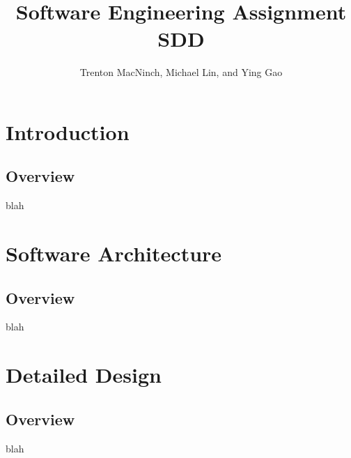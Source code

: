 \documentclass{article}
\title{\textbf{Software Engineering Assignment SDD}}
\author{Trenton MacNinch, Michael Lin, and Ying Gao}
\begin{document}
\maketitle
\newpage

\tableofcontents
\newpage

\section{Introduction}
\subsection{Overview}
blah

\section{Software Architecture}
\subsection{Overview}
blah

\section{Detailed Design}
\subsection{Overview}
blah
\end{document}
